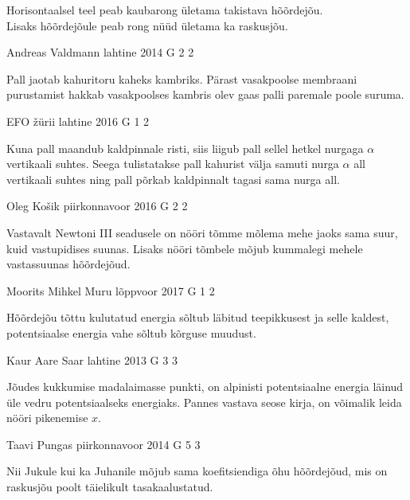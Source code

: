 \documentclass[11pt, twoside]{article}
\begin{document}
{{\ifHint
\osa Horisontaalsel teel peab kaubarong ületama takistava hõõrdejõu.\\
\osa Lisaks hõõrdejõule peab rong nüüd ületama ka raskusjõu.
\fi
}

{Andreas Valdmann} %
{lahtine} %
{2014} %
{G 2} %
{2} %
{

\ifHint
Pall jaotab kahuritoru kaheks kambriks. Pärast vasakpoolse membraani purustamist hakkab vasakpoolses kambris olev gaas palli paremale poole suruma.
\fi
}

{EFO žürii} %
{lahtine} %
{2016} %
{G 1} %
{2} %
{

\ifHint
Kuna pall maandub kaldpinnale risti, siis liigub pall sellel hetkel nurgaga $\alpha$ vertikaali suhtes. Seega tulistatakse pall kahurist välja samuti nurga $\alpha$ all vertikaali suhtes ning pall põrkab kaldpinnalt tagasi sama nurga all.
\fi
}

{Oleg Košik} %
{piirkonnavoor} %
{2016} %
{G 2} %
{2} %
{

\ifHint
Vastavalt Newtoni III seadusele on nööri tõmme mõlema mehe jaoks sama suur, kuid vastupidises suunas. Lisaks nööri tõmbele mõjub kummalegi mehele vastassuunas hõõrdejõud.
\fi
}

{Moorits Mihkel Muru} %
{lõppvoor} %
{2017} %
{G 1} %
{2} %
{

\ifHint
Hõõrdejõu tõttu kulutatud energia sõltub läbitud teepikkusest ja selle kaldest, potentsiaalse energia vahe sõltub kõrguse muudust.
\fi
}

{Kaur Aare Saar} %
{lahtine} %
{2013} %
{G 3} %
{3} %
{

\ifHint
Jõudes kukkumise madalaimasse punkti, on alpinisti potentsiaalne energia läinud üle vedru potentsiaalseks energiaks. Pannes vastava seose kirja, on võimalik leida nööri pikenemise $x$.
\fi
}

{Taavi Pungas} %
{piirkonnavoor} %
{2014} %
{G 5} %
{3} %
{

\ifHint
Nii Jukule kui ka Juhanile mõjub sama koefitsiendiga õhu hõõrdejõud, mis on raskusjõu poolt täielikult tasakaalustatud.
\fi
}

}
\end{document}
